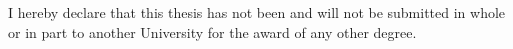 \thispagestyle{plain}


\vspace*{\fill}

I hereby declare that this thesis has not been and will not be
submitted in whole or in part to another University for the award of
any other degree.

\vskip3cm
\begin{flushright}
  \hspace{0.5cm} \makebox[7cm]{\hrulefill}\\ %
  \aauthor%
\end{flushright}
\vspace*{\fill}
\vspace{14cm}

